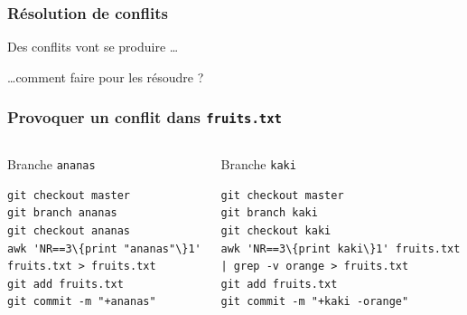 \documentclass[table,tikz,12pt,svgnames]{beamer}
\begin{document}
\begin{frame}
\frametitle{Résolution de conflits}
\begin{block}{Des conflits vont se produire \ldots}
\end{block}
\begin{block}{\ldots comment faire pour les résoudre ?}
\end{block}
\end{frame}


\begin{frame}[fragile]
\frametitle{Provoquer un conflit dans \texttt{fruits.txt}}
\vspace{-0.2em}
\begin{adjustwidth}{-0.6cm}{-0.6cm}{}
\begin{columns}[T] %
	\begin{column}{.55\textwidth}
		\color{darkgreen}
		Branche \texttt{ananas}
		\color{black}
		\begin{verbatim}
git checkout master
git branch ananas
git checkout ananas
awk 'NR==3\{print "ananas"\}1' fruits.txt > fruits.txt
git add fruits.txt
git commit -m "+ananas"
		\end{verbatim}
	\end{column}%
	\hfill%
	\begin{column}{.52\textwidth}
		\vspace{-0.2em}
		\color{blue}%
		Branche \texttt{kaki}
		\color{black}
		\vspace{-0.3em}
\begin{verbatim}
git checkout master
git branch kaki
git checkout kaki
awk 'NR==3\{print kaki\}1' fruits.txt | grep -v orange > fruits.txt
git add fruits.txt
git commit -m "+kaki -orange"
\end{verbatim}
\end{column}%
\end{columns}
\end{adjustwidth}


\end{frame}
\end{document}
